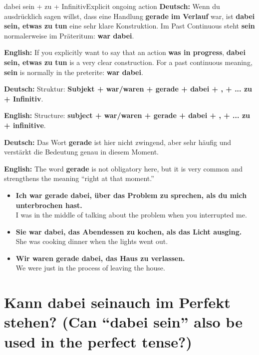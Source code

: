 \documentclass[a4paper,11pt]{article}
\newcommand{\GermanText}[1]{\textbf{Deutsch: }#1\par}
\newcommand{\EnglishText}[1]{{\small\color{SoftGray}\textbf{English: }#1\par}}
\newcommand{\ExampleItem}[2]{\item \textbf{#1}\\{\small\color{SoftGray}#2}}
\begin{document}
        \begin{grammarentry}{dabei sein + zu + Infinitiv}{Explicit ongoing action}
            \GermanText{Wenn du ausdrücklich sagen willst, dass eine Handlung \textbf{gerade im Verlauf} war, ist \textbf{dabei sein, etwas zu tun} eine sehr klare Konstruktion. Im Past Continuous steht \textbf{sein} normalerweise im Präteritum: \textbf{war dabei}.}
            \EnglishText{If you explicitly want to say that an action \textbf{was in progress}, \textbf{dabei sein, etwas zu tun} is a very clear construction. For a past continuous meaning, \textbf{sein} is normally in the preterite: \textbf{war dabei}.}

            \GermanText{Struktur: \textbf{Subjekt + war/waren + gerade + dabei + , + ... zu + Infinitiv}.}
            \EnglishText{Structure: \textbf{subject + war/waren + gerade + dabei + , + ... zu + infinitive}.}

            \GermanText{Das Wort \textbf{gerade} ist hier nicht zwingend, aber sehr häufig und verstärkt die Bedeutung \glqq genau in diesem Moment\grqq.}
            \EnglishText{The word \textbf{gerade} is not obligatory here, but it is very common and strengthens the meaning ``right at that moment.''}
        \end{grammarentry}

        \begin{exbox}
            \begin{itemize}
                \ExampleItem{Ich war gerade dabei, über das Problem zu sprechen, als du mich unterbrochen hast.}{I was in the middle of talking about the problem when you interrupted me.}
                \ExampleItem{Sie war dabei, das Abendessen zu kochen, als das Licht ausging.}{She was cooking dinner when the lights went out.}
                \ExampleItem{Wir waren gerade dabei, das Haus zu verlassen.}{We were just in the process of leaving the house.}
            \end{itemize}
        \end{exbox}

    \section{Kann \glqq dabei sein\grqq auch im Perfekt stehen? \textnormal{(Can ``dabei sein'' also be used in the perfect tense?)}}
\end{document}
